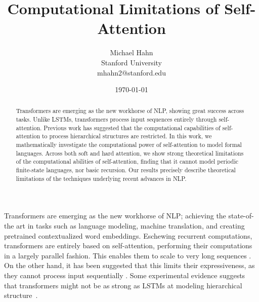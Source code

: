 \documentclass[11pt,a4paper]{article}
\title{Computational Limitations of Self-Attention}
\author{Michael Hahn \\ Stanford University \\ mhahn2@stanford.edu}
\date{\today}
\begin{document}
\maketitle
\begin{abstract}
Transformers are emerging as the new workhorse of NLP, showing great success across tasks.
Unlike LSTMs, transformers process input sequences entirely through self-attention.
Previous work has suggested that the computational capabilities of self-attention to process hierarchical structures are restricted.
In this work, we mathematically investigate the computational power of self-attention to model formal languages.
Across both soft and hard attention, we show strong theoretical limitations of the computational abilities of self-attention, finding that it cannot model periodic finite-state languages, nor basic recursion. %
Our results precisely describe theoretical limitations of the techniques underlying recent advances in NLP.
\end{abstract}


Transformers are emerging as the new workhorse of NLP; achieving the state-of-the art in tasks such as language modeling, machine translation, and creating pretrained contextualized word embeddings.
Eschewing recurrent computations, transformers are entirely based on self-attention, performing their computations in a largely parallel fashion.
This enables them to scale to very long sequences \cite{vaswani2017attention,dai2019transformer,child2019generating}.
On the other hand, it has been suggested that this limits their expressiveness, as they cannot process input sequentially \cite{tran2018importance,dehghani2018universal,shen2018disan,chen2018best,hao2019modeling}.
Some experimental evidence suggests that transformers might not be as strong as LSTMs at modeling hierarchical structure~\cite{tran2018importance}.
\end{document}
